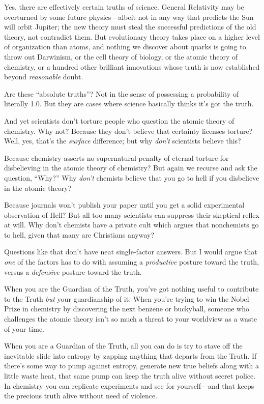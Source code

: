 {
 Yes, there are effectively certain truths of science. General
Relativity may be overturned by some future physics---albeit not in any
way that predicts the Sun will orbit Jupiter; the new theory must steal
the successful predictions of the old theory, not contradict them. But
evolutionary theory takes place on a higher level of organization than
atoms, and nothing we discover about quarks is going to throw out
Darwinism, or the cell theory of biology, or the atomic theory of
chemistry, or a hundred other brilliant innovations whose truth is now
established beyond \textit{reasonable} doubt.}

{
 Are these ``absolute truths''?
Not in the sense of possessing a probability of literally 1.0. But they
are cases where science basically thinks it's got the
truth.}

{
 And yet scientists don't torture people who
question the atomic theory of chemistry. Why not? Because they
don't believe that certainty licenses torture? Well,
yes, that's the \textit{surface} difference; but why
\textit{don't} scientists believe this?}

{
 Because chemistry asserts no supernatural penalty of eternal
torture for disbelieving in the atomic theory of chemistry? But again
we recurse and ask the question,
``Why?'' Why
\textit{don't} chemists believe that you go to hell if
you disbelieve in the atomic theory?}

{
 Because journals won't publish your paper until
you get a solid experimental observation of Hell? But all too many
scientists can suppress their skeptical reflex at will. Why
don't chemists have a private cult which argues that
nonchemists go to hell, given that many are Christians anyway?}

{
 Questions like that don't have neat single-factor
answers. But I would argue that \textit{one} of the factors has to do
with assuming a \textit{productive} posture toward the truth, versus a
\textit{defensive} posture toward the truth.}

{
 When you are the Guardian of the Truth, you've got
nothing useful to contribute to the Truth \textit{but} your
guardianship of it. When you're trying to win the Nobel
Prize in chemistry by discovering the next benzene or buckyball,
someone who challenges the atomic theory isn't so much
a threat to your worldview as a waste of your time.}

{
 When you are a Guardian of the Truth, all you can do is try to
stave off the inevitable slide into entropy by zapping anything that
departs from the Truth. If there's some way to pump
against entropy, generate new true beliefs along with a little waste
heat, that same pump can keep the truth alive without secret police. In
chemistry you can replicate experiments and see for yourself---and that
keeps the precious truth alive without need of violence.}

